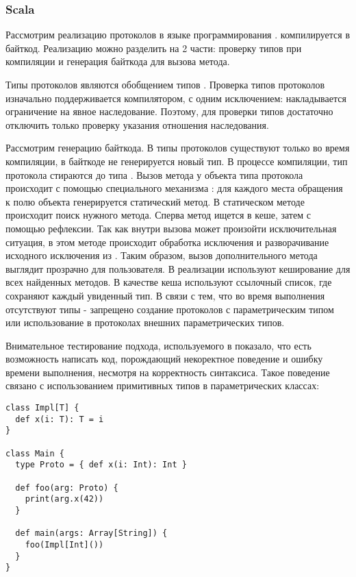 \subsubsection{Scala}
Рассмотрим реализацию протоколов в языке программирования \cite{scala:structural}.  компилируется в  байткод. Реализацию можно разделить на 2 части: проверку типов при компиляции и генерация байткода для вызова метода.

Типы протоколов являются обобщением типов . Проверка типов протоколов изначально поддерживается компилятором, с одним исключением: накладывается ограничение на явное наследование. Поэтому, для проверки типов достаточно отключить только проверку указания отношения наследования.

Рассмотрим генерацию байткода. В  типы протоколов существуют только во время компиляции, в байткоде не генерируется новый тип. В процессе компиляции, тип протокола стираются до типа . Вызов метода у объекта типа протокола происходит с помощью специального механизма : для каждого места обращения к полю объекта генерируется статический метод. В статическом методе происходит поиск нужного метода. Сперва метод ищется в кеше\cite{9780262033848}, затем с помощью рефлексии. Так как внутри вызова может произойти исключительная ситуация, в этом методе происходит обработка исключения и разворачивание исходного исключения из . Таким образом, вызов дополнительного метода выглядит прозрачно для пользователя. В реализации используют кеширование для всех найденных методов. В качестве кеша используют ссылочный список, где сохраняют каждый увиденный тип. В связи с тем, что во время выполнения отсутствуют типы - запрещено создание протоколов с параметрическим типом или использование в протоколах внешних параметрических типов.

Внимательное тестирование подхода, используемого в  показало, что есть возможность написать код, порождающий некоректное поведение и ошибку времени выполнения, несмотря на корректность синтаксиса. Такое поведение связано с использованием примитивных типов в параметрических классах:

\begin{verbatim}
class Impl[T] {
  def x(i: T): T = i
}

class Main {
  type Proto = { def x(i: Int): Int }

  def foo(arg: Proto) {
    print(arg.x(42))
  }

  def main(args: Array[String]) {
    foo(Impl[Int]())
  }
}
\end{verbatim}

